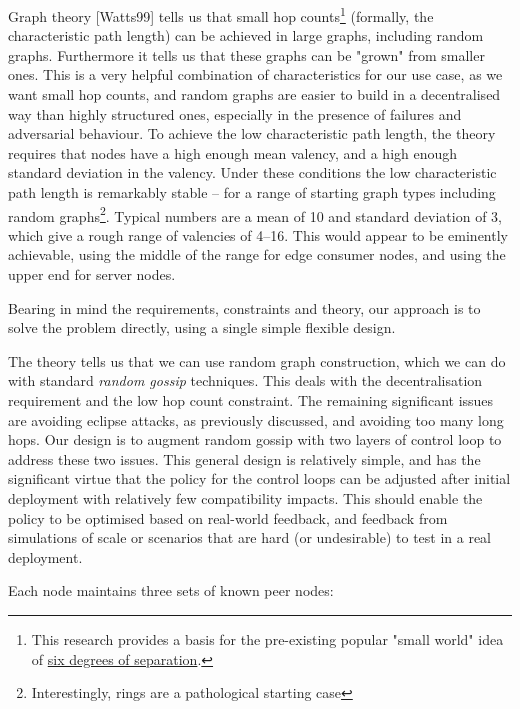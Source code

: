 \documentclass[]{article}
\begin{document}
Graph theory {[}Watts99{]} tells us that small hop counts\footnote{This
  research provides a basis for the pre-existing popular "small world"
  idea of
  \href{https://en.wikipedia.org/wiki/Six_degrees_of_separation\#Computer_networks}{{six
  degrees of separation}}.} (formally, the characteristic path length)
can be achieved in large graphs, including random graphs. Furthermore it
tells us that these graphs can be "grown" from smaller ones. This is a
very helpful combination of characteristics for our use case, as we want
small hop counts, and random graphs are easier to build in a
decentralised way than highly structured ones, especially in the
presence of failures and adversarial behaviour. To achieve the low
characteristic path length, the theory requires that nodes have a high
enough mean valency, and a high enough standard deviation in the
valency. Under these conditions the low characteristic path length is
remarkably stable -- for a range of starting graph types including
random graphs\footnote{Interestingly, rings are a pathological starting
  case}. Typical numbers are a mean of 10 and standard deviation of 3,
which give a rough range of valencies of 4--16. This would appear to be
eminently achievable, using the middle of the range for edge consumer
nodes, and using the upper end for server nodes.

Bearing in mind the requirements, constraints and theory, our approach
is to solve the problem directly, using a single simple flexible design.

The theory tells us that we can use random graph construction, which we
can do with standard \emph{random gossip} techniques. This deals with
the decentralisation requirement and the low hop count constraint. The
remaining significant issues are avoiding eclipse attacks, as previously
discussed, and avoiding too many long hops. Our design is to augment
random gossip with two layers of control loop to address these two
issues. This general design is relatively simple, and has the
significant virtue that the policy for the control loops can be adjusted
after initial deployment with relatively few compatibility impacts. This
should enable the policy to be optimised based on real-world feedback,
and feedback from simulations of scale or scenarios that are hard (or
undesirable) to test in a real deployment.

Each node maintains three sets of known peer nodes:
\end{document}
